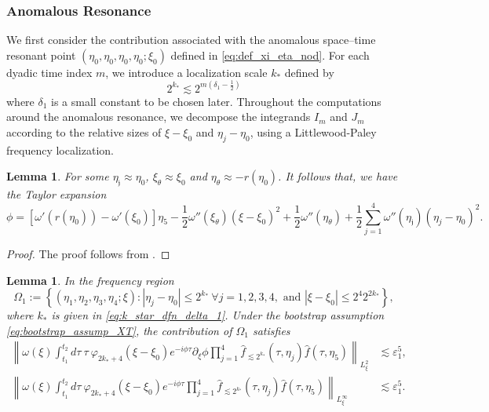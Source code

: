 \documentclass[reqno,english,11pt]{amsart}
\newcommand{\eps}{\varepsilon}
\newcommand{\snorm}[1]{\left\|#1\right\|}
\newtheorem{lemma}[theorem]{Lemma}
\theoremstyle{definition}
\numberwithin{equation}{section}
\begin{document}
\subsubsection{Anomalous Resonance}
We first consider the contribution associated with the anomalous space--time resonant point $(\eta_0,\eta_0,\eta_0,\eta_0;\xi_0)$  defined in \eqref{eq:def_xi_eta_nod}. 
For each dyadic time index $m$, we introduce a localization scale
$k_{*}$ defined by 
\begin{equation}\label{eq:k_star_dfn_delta_1}
2^{k_{*}} \lesssim 2^{m(\delta_1-\frac12)}
\end{equation}
where $\delta_1$ is a small constant to be chosen later. Throughout the computations around  the anomalous resonance, we decompose the integrands $I_m$ and $J_m$ according to the relative sizes of $\xi-\xi_0$ and $\eta_j-\eta_0$, using a Littlewood-Paley frequency localization.
\begin{lemma}\label{lem:anomalous_resonance_general_taylor}
    For some $\eta_{\mathfrak{j}}\approx \eta_0$, $\xi_\theta\approx \xi_0$ and $\eta_{\theta}\approx -r(\eta_0)$. It follows that, we have the Taylor expansion
\begin{equation}\label{eq:anomalous_resonance_general_taylor}
    \phi= \left[\omega'\left(r(\eta_0)\right)-\omega'(\xi_0)\right]\eta_5-\frac{1}{2}\omega''(\xi_\theta)(\xi-\xi_0)^2+\frac{1}{2}\omega''(\eta_\theta)+\frac{1}{2}\sum^{4}_{j=1}\omega''(\eta_{\mathfrak{j}})(\eta_j-\eta_0)^2.
\end{equation}
\end{lemma}
\begin{proof}
    The proof follows from \cite[p. 123]{MorganThesis}.
\end{proof}
\begin{lemma}
\label{prop:anomalous_resonance_near_resonance}
In the frequency region
\begin{equation}\label{eqn:near_res_region}
    \Omega_1:= \left\{ (\eta_1, \eta_2, \eta_3, \eta_4; \xi) : |\eta_j - \eta_0| \le 2^{k_*} \ \forall j=1,2,3,4, \text{ and } |\xi - \xi_0| \le 2^4 2^{2k_*} \right\},
\end{equation}
where $k_*$  is given in \eqref{eq:k_star_dfn_delta_1}. Under the bootstrap assumption \eqref{eq:bootstrap_assump_XT}, the contribution of $\Omega_1$ satisfies
\begin{align}
\snorm{\omega(\xi)\int_{t_1}^{t_2}d\tau \ \tau\ \varphi_{2k_{*}+4}\left(\xi-\xi_0\right)e^{-i\phi \tau} \partial_{\xi}\phi \prod^4_{j=1} \widehat{f}_{\lesssim 2^{k_{*}}} \left(\tau,\eta_{j}\right)  
    \widehat{f}\left(\tau,\eta_{5}\right)}_{L^2_\xi} &\lesssim \eps_1^5, \\
\snorm{\omega(\xi)\int_{t_1}^{t_2}d\tau \ \varphi_{2k_{*}+4}\left(\xi-\xi_0\right)e^{-i\phi \tau}  \prod^4_{j=1} \widehat{f}_{\lesssim 2^{k_{*}}} \left(\tau,\eta_{j}\right)  
    \widehat{f}\left(\tau,\eta_{5}\right)}_{L^\infty_\xi} &\lesssim \eps_1^5.
\end{align}
\end{lemma}
\end{document}
